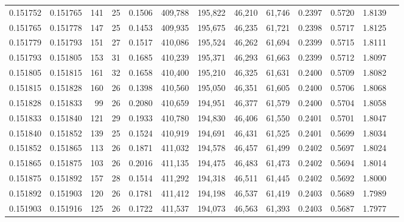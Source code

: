 \begin{tabular}{rrrrrrrrrrrrr}
0.151752 & 0.151765 & 141 &  25 &                                     0.1506 & 409,788 & 195,822 &  46,210 &  61,746 & 0.2397 & 0.5720 & 1.8139 \\
0.151765 & 0.151778 & 147 &  25 &                                     0.1453 & 409,935 & 195,675 &  46,235 &  61,721 & 0.2398 & 0.5717 & 1.8125 \\
0.151779 & 0.151793 & 151 &  27 &                                     0.1517 & 410,086 & 195,524 &  46,262 &  61,694 & 0.2399 & 0.5715 & 1.8111 \\
0.151793 & 0.151805 & 153 &  31 &                                     0.1685 & 410,239 & 195,371 &  46,293 &  61,663 & 0.2399 & 0.5712 & 1.8097 \\
0.151805 & 0.151815 & 161 &  32 &                                     0.1658 & 410,400 & 195,210 &  46,325 &  61,631 & 0.2400 & 0.5709 & 1.8082 \\
0.151815 & 0.151828 & 160 &  26 &                                     0.1398 & 410,560 & 195,050 &  46,351 &  61,605 & 0.2400 & 0.5706 & 1.8068 \\
0.151828 & 0.151833 &  99 &  26 &                                     0.2080 & 410,659 & 194,951 &  46,377 &  61,579 & 0.2400 & 0.5704 & 1.8058 \\
0.151833 & 0.151840 & 121 &  29 &                                     0.1933 & 410,780 & 194,830 &  46,406 &  61,550 & 0.2401 & 0.5701 & 1.8047 \\
0.151840 & 0.151852 & 139 &  25 &                                     0.1524 & 410,919 & 194,691 &  46,431 &  61,525 & 0.2401 & 0.5699 & 1.8034 \\
0.151852 & 0.151865 & 113 &  26 &                                     0.1871 & 411,032 & 194,578 &  46,457 &  61,499 & 0.2402 & 0.5697 & 1.8024 \\
0.151865 & 0.151875 & 103 &  26 &                                     0.2016 & 411,135 & 194,475 &  46,483 &  61,473 & 0.2402 & 0.5694 & 1.8014 \\
0.151875 & 0.151892 & 157 &  28 &                                     0.1514 & 411,292 & 194,318 &  46,511 &  61,445 & 0.2402 & 0.5692 & 1.8000 \\
0.151892 & 0.151903 & 120 &  26 &                                     0.1781 & 411,412 & 194,198 &  46,537 &  61,419 & 0.2403 & 0.5689 & 1.7989 \\
0.151903 & 0.151916 & 125 &  26 &                                     0.1722 & 411,537 & 194,073 &  46,563 &  61,393 & 0.2403 & 0.5687 & 1.7977 \\

\end{tabular}
